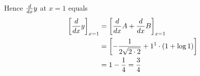 \documentclass[14pt,fleqn]{extarticle}
\begin{document}
\begin{question}
\begin{step}
Hence $\frac{d}{dx} y$ at $x = 1$ equals 
\begin{align}
\left[\frac{d}{dx} y \right]_{x=1} &= \left[\frac{d}{dx} A + \frac{d}{dx} B \right]_{x=1} \\ 
&= \left[- \frac{1}{2\sqrt{2\cdot 2}} + 1^1\cdot \left(1 + \log 1 \right)  \right] \\
&= 1 - \frac{1}{4} = \frac{3}{4}
\end{align}
\end{step}
\end{question} 
\end{document}
